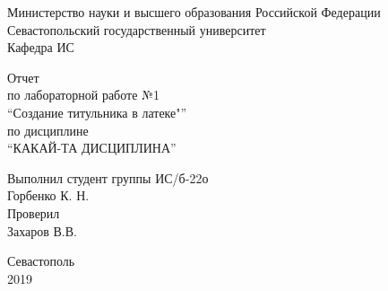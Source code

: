 \documentclass[a4paper,14pt]{extarticle}
\newcommand{\mylabnumber}{1}
\newcommand{\mylabtitle}{Создание титульника в латеке}
\newcommand{\mysubject}{Какай-та дисциплина}
\newcommand{\mylecturer}{Захаров В.В.}
\begin{document}
    \lstset{ %
        basicstyle=\footnotesize\ttfamily,
        numbersep=5pt,
        tabsize=4,
        gobble=8,
        extendedchars=\true,
        keepspaces=\true,
        numbers=left,
        stringstyle=\ttfamily,
        showstringspaces=\false
    }


    \begin{titlepage}
        
        \thispagestyle{empty}
        
        \begin{center}
            
            Министерство науки и высшего образования Российской Федерации \\
            Севастопольский государственный университет \\
            Кафедра ИС
            
            \vfill

            Отчет \\
            по лабораторной работе №\mylabnumber \\
            \enquote{\mylabtitle"} \\
            по дисциплине \\
            \enquote{\MakeTextUppercase{\mysubject}}

        \end{center}

        \vspace{1cm}

        \noindent\hspace{7.5cm} Выполнил студент группы ИС/б-22о \\
        \null\hspace{7.5cm} Горбенко К. Н. \\
        \null\hspace{7.5cm} Проверил \\
        \null\hspace{7.5cm} \mylecturer

        \vfill

        \begin{center}
            Севастополь \\
            2019
        \end{center}

    \end{titlepage}
\end{document}
